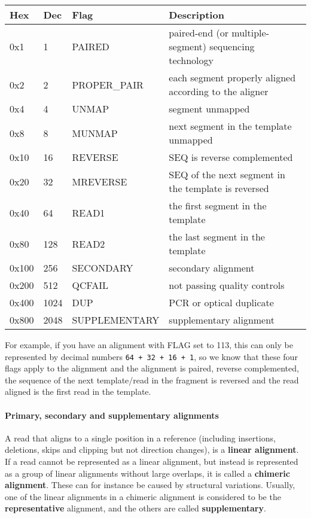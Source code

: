 \documentclass[11pt]{article}
\begin{document}
\begin{longtable}[]{@{}llll@{}}
\toprule
Hex & Dec & Flag & Description \\
\midrule
\endhead
0x1 & 1 & PAIRED & paired-end (or multiple-segment) sequencing
technology \\
0x2 & 2 & PROPER\_PAIR & each segment properly aligned according to the
aligner \\
0x4 & 4 & UNMAP & segment unmapped \\
0x8 & 8 & MUNMAP & next segment in the template unmapped \\
0x10 & 16 & REVERSE & SEQ is reverse complemented \\
0x20 & 32 & MREVERSE & SEQ of the next segment in the template is
reversed \\
0x40 & 64 & READ1 & the first segment in the template \\
0x80 & 128 & READ2 & the last segment in the template \\
0x100 & 256 & SECONDARY & secondary alignment \\
0x200 & 512 & QCFAIL & not passing quality controls \\
0x400 & 1024 & DUP & PCR or optical duplicate \\
0x800 & 2048 & SUPPLEMENTARY & supplementary alignment \\
\bottomrule
\end{longtable}

For example, if you have an alignment with FLAG set to 113, this can
only be represented by decimal numbers \texttt{64\ +\ 32\ +\ 16\ +\ 1},
so we know that these four flags apply to the alignment and the
alignment is paired, reverse complemented, the sequence of the next
template/read in the fragment is reversed and the read aligned is the
first read in the template.

\hypertarget{primary-secondary-and-supplementary-alignments}{%
\paragraph{Primary, secondary and supplementary
alignments}\label{primary-secondary-and-supplementary-alignments}}

A read that aligns to a single position in a reference (including
insertions, deletions, skips and clipping but not direction changes), is
a \textbf{linear alignment}. If a read cannot be represented as a linear
alignment, but instead is represented as a group of linear alignments
without large overlaps, it is called a \textbf{chimeric alignment}.
These can for instance be caused by structural variations. Usually, one
of the linear alignments in a chimeric alignment is considered to be the
\textbf{representative} alignment, and the others are called
\textbf{supplementary}.
\end{document}
